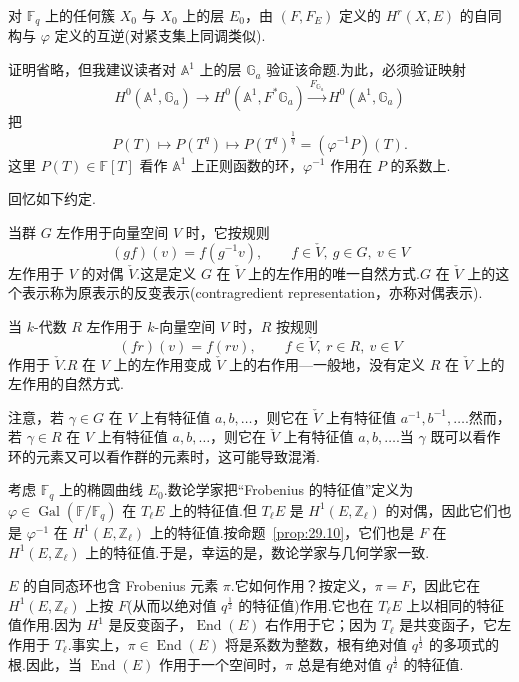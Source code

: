 \begin{proposition}\label{prop:29.10}
对 $\mathbb{F}_q$ 上的任何簇 $X_0$ 与 $X_0$ 上的层 $E_0$，由 $(F, F_E)$ 定义的 $H^{r}(X, E)$ 的自同构与 $\varphi$ 定义的互逆(对紧支集上同调类似).
\end{proposition}

证明省略，但我建议读者对 $\mathbb{A}^{1}$ 上的层 $\mathbb{G}_{a}$ 验证该命题.为此，必须验证映射
\[
H^{0}(\mathbb{A}^{1}, \mathbb{G}_{a}) \to H^{0}(\mathbb{A}^{1}, F^{*}\mathbb{G}_{a}) \xrightarrow{F_{\mathbb{G}_{a}}} H^{0}(\mathbb{A}^{1}, \mathbb{G}_{a})
\]
把
\[
P(T) \mapsto P(T^{q}) \mapsto P(T^{q})^{\frac{1}{q}} = (\varphi^{-1}P)(T).
\]
这里 $P(T) \in \mathbb{F}[T]$ 看作 $\mathbb{A}^{1}$ 上正则函数的环，$\varphi^{-1}$ 作用在 $P$ 的系数上.

\begin{remark}\label{rem:29.11}
回忆如下约定.

当群 $G$ 左作用于向量空间 $V$ 时，它按规则
\[
(gf)(v) = f(g^{-1}v), \qquad f \in \check{V}, \ g \in G, \ v \in V
\]
左作用于 $V$ 的对偶 $\check{V}$.这是定义 $G$ 在 $\check{V}$ 上的左作用的唯一自然方式.$G$ 在 $\check{V}$ 上的这个表示称为原表示的反变表示(contragredient representation，亦称对偶表示).

当 $k$-代数 $R$ 左作用于 $k$-向量空间 $V$ 时，$R$ 按规则
\[
(fr)(v) = f(rv), \qquad f \in \check{V}, \ r \in R, \ v \in V
\]
作用于 $\check{V}$.$R$ 在 $V$ 上的左作用变成 $\check{V}$ 上的右作用---一般地，没有定义 $R$ 在 $\check{V}$ 上的左作用的自然方式.

注意，若 $\gamma \in G$ 在 $V$ 上有特征值 $a, b, \ldots$，则它在 $\check{V}$ 上有特征值 $a^{-1}, b^{-1}, \ldots$.然而，若 $\gamma \in R$ 在 $V$ 上有特征值 $a, b, \ldots$，则它在 $\check{V}$ 上有特征值 $a, b, \ldots$.当 $\gamma$ 既可以看作环的元素又可以看作群的元素时，这可能导致混淆.

考虑 $\mathbb{F}_q$ 上的椭圆曲线 $E_0$.数论学家把``Frobenius 的特征值''定义为 $\varphi \in \operatorname{Gal}(\mathbb{F}/\mathbb{F}_q)$ 在 $T_{\ell}E$ 上的特征值.但 $T_{\ell}E$ 是 $H^{1}(E, \mathbb{Z}_{\ell})$ 的对偶，因此它们也是 $\varphi^{-1}$ 在 $H^{1}(E, \mathbb{Z}_{\ell})$ 上的特征值.按命题~\ref{prop:29.10}，它们也是 $F$ 在 $H^{1}(E, \mathbb{Z}_{\ell})$ 上的特征值.于是，幸运的是，数论学家与几何学家一致.

$E$ 的自同态环也含 Frobenius 元素 $\pi$.它如何作用？按定义，$\pi = F$，因此它在 $H^{1}(E, \mathbb{Z}_{\ell})$ 上按 $F$(从而以绝对值 $q^{\frac{1}{2}}$ 的特征值)作用.它也在 $T_{\ell}E$ 上以相同的特征值作用.因为 $H^{1}$ 是反变函子，$\operatorname{End}(E)$ 右作用于它；因为 $T_{\ell}$ 是共变函子，它左作用于 $T_{\ell}$.事实上，$\pi \in \operatorname{End}(E)$ 将是系数为整数，根有绝对值 $q^{\frac{1}{2}}$ 的多项式的根.因此，当 $\operatorname{End}(E)$ 作用于一个空间时，$\pi$ 总是有绝对值 $q^{\frac{1}{2}}$ 的特征值.
\end{remark}


